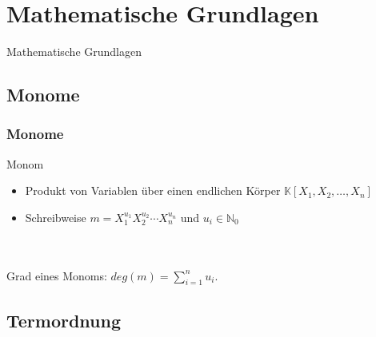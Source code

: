 \documentclass{beamer}
\begin{document}

\section{Mathematische Grundlagen}

\begin{frame}
\centerline{Mathematische Grundlagen}
\end{frame}

\subsection{Monome}

\begin{frame}[<+->][fragile]
\frametitle{Monome }

\begin{block}{Monom}
\begin{itemize}
\item Produkt von Variablen über einen endlichen Körper $ \mathbb{K} \left[X_{1},X_{2},\dots, X_{n}\right]  $ 
\item Schreibweise $m= X_{1}^{u_{1}}X_{2}^{u_{2}}\cdots X_{n}^{u_{n}}$ und $u_i \in \mathbb{N}_{0}  $
\end{itemize}

\end{block}
~\\
~\\
Grad eines Monoms:  $deg(m) = \sum_{i=1}^n u_i $. 




\end{frame}

\subsection{Termordnung}
\end{document}
